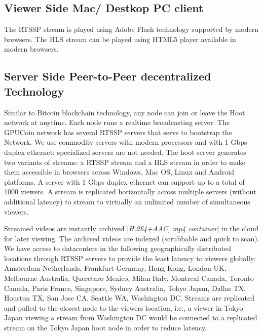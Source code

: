 \subsection{Viewer Side Mac/ Destkop PC client} 
The RTSSP stream is played using Adobe Flash technology supported by modern browsers. The HLS stream can be played using HTML5 player available in modern browsers.

\subsection{Server Side Peer-to-Peer decentralized Technology}
Similar to Bitcoin blockchain technology, any node can join or leave the Hoot network at anytime. Each node runs a realtime broadcasting server.
The GPUCoin network has several RTSSP servers that serve to bootstrap the Network. We use commodity servers with modern processors and with 1 Gbps duplex ethernet; specialized servers are not needed. The hoot server generates two variants of streams: a RTSSP stream and a HLS stream in order to make them accessible in browsers across Windows, Mac OS, Linux and Android platforms. A server with 1 Gbps duplex ethernet can support up to a total of 1000 viewers. A stream is replicated horizontally across multiple servers (without additional latency) to stream to virtually an unlimited number of simultaneous viewers. 

Streamed videos are instantly archived [\emph{H.264+AAC, mp4 container}] in the cloud for later viewing. The archived videos are indexed (scrubbable and quick to scan). We have access to datacenters in the following geographically distributed locations through RTSSP servers to provide the least latency to viewers globally: Amsterdam Netherlands, Frankfurt Germany, Hong Kong, London UK, Melbourne Australia, Queretaro Mexico, Milan Italy, Montreal Canada, Toronto Canada, Paris France, Singapore, Sydney Australia, Tokyo Japan, Dallas TX, Houston TX, San Jose CA, Seattle WA, Washington DC. 
Streams are replicated and pulled to the closest node to the viewers location, i.e., a viewer in Tokyo Japan viewing a stream from Washington DC would be connected to a replicated stream on the Tokyo Japan hoot node in order to reduce latency.

